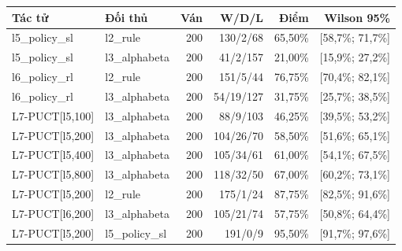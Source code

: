 \begin{center}\small
\begin{tabular}{@{}llrrrr@{}}
\toprule
Tác tử & Đối thủ & Ván & W/D/L & Điểm & Wilson 95\% \\
\midrule
l5\_policy\_sl & l2\_rule & 200 & 130/2/68 & 65,50\% & [58,7\%; 71,7\%] \\
l5\_policy\_sl & l3\_alphabeta & 200 & 41/2/157 & 21,00\% & [15,9\%; 27,2\%] \\
l6\_policy\_rl & l2\_rule & 200 & 151/5/44 & 76,75\% & [70,4\%; 82,1\%] \\
l6\_policy\_rl & l3\_alphabeta & 200 & 54/19/127 & 31,75\% & [25,7\%; 38,5\%] \\
L7-PUCT[l5,100] & l3\_alphabeta & 200 & 88/9/103 & 46,25\% & [39,5\%; 53,2\%] \\
L7-PUCT[l5,200] & l3\_alphabeta & 200 & 104/26/70 & 58,50\% & [51,6\%; 65,1\%] \\
L7-PUCT[l5,400] & l3\_alphabeta & 200 & 105/34/61 & 61,00\% & [54,1\%; 67,5\%] \\
L7-PUCT[l5,800] & l3\_alphabeta & 200 & 118/32/50 & 67,00\% & [60,2\%; 73,1\%] \\
L7-PUCT[l5,200] & l2\_rule & 200 & 175/1/24 & 87,75\% & [82,5\%; 91,6\%] \\
L7-PUCT[l6,200] & l3\_alphabeta & 200 & 105/21/74 & 57,75\% & [50,8\%; 64,4\%] \\
L7-PUCT[l5,200] & l5\_policy\_sl & 200 & 191/0/9 & 95,50\% & [91,7\%; 97,6\%] \\
\bottomrule
\end{tabular}
\end{center}